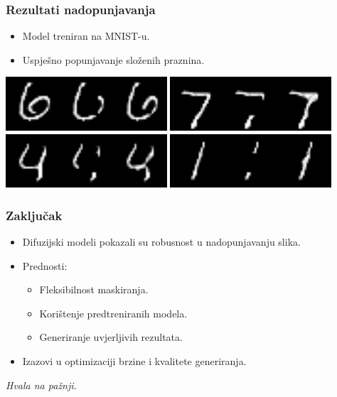 \documentclass{beamer}
\begin{document}
\begin{frame}
    \frametitle{Rezultati nadopunjavanja}
    \begin{itemize}
        \item Model treniran na MNIST-u.
        \pause
        \item Uspješno popunjavanje složenih praznina.
        \pause
    \end{itemize}
    \includegraphics[width=0.45\textwidth]{../repaint_output/inpainted_combined_6.png}
    \includegraphics[width=0.45\textwidth]{../repaint_output/inpainted_combined_7.png}
    \includegraphics[width=0.45\textwidth]{../repaint_output/inpainted_combined_4.png}
    \includegraphics[width=0.45\textwidth]{../repaint_output/inpainted_combined_1.png}
\end{frame}

\begin{frame}
    \frametitle{Zaključak}
    \begin{itemize}
        \item Difuzijski modeli pokazali su robusnost u nadopunjavanju slika.
        \pause
        \item Prednosti:
        \begin{itemize}
            \item Fleksibilnost maskiranja.
            \item Korištenje predtreniranih modela.
            \item Generiranje uvjerljivih rezultata.
        \end{itemize}
        \pause
        \item Izazovi u optimizaciji brzine i kvalitete generiranja.
    \end{itemize}
\end{frame}

\begin{frame}{}
  \centering \Large
  \emph{Hvala na pažnji.}
\end{frame}
\end{document}
